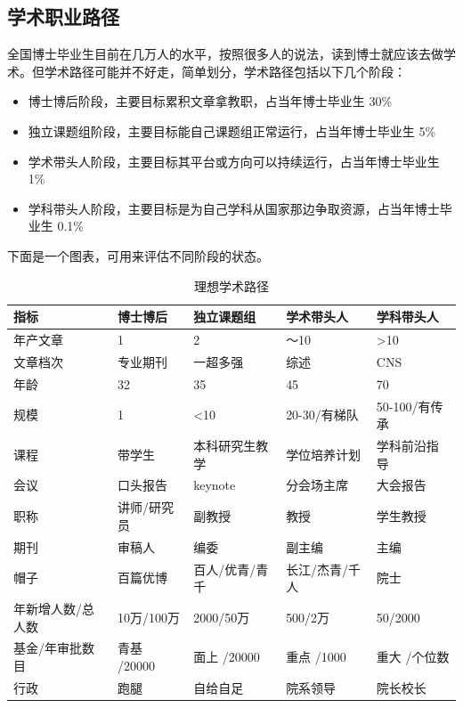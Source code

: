 \documentclass[]{tufte-book}
\begin{document}
\hypertarget{ux5b66ux672fux804cux4e1aux8defux5f84}{%
\subsection{学术职业路径}\label{ux5b66ux672fux804cux4e1aux8defux5f84}}

全国博士毕业生目前在几万人的水平，按照很多人的说法，读到博士就应该去做学术。但学术路径可能并不好走，简单划分，学术路径包括以下几个阶段：

\begin{itemize}
\item
  博士博后阶段，主要目标累积文章拿教职，占当年博士毕业生 30\%
\item
  独立课题组阶段，主要目标能自己课题组正常运行，占当年博士毕业生 5\%
\item
  学术带头人阶段，主要目标其平台或方向可以持续运行，占当年博士毕业生 1\%
\item
  学科带头人阶段，主要目标是为自己学科从国家那边争取资源，占当年博士毕业生 0.1\%
\end{itemize}

下面是一个图表，可用来评估不同阶段的状态。

\begin{longtable}[t]{lllll}
\caption{\label{tab:unnamed-chunk-9}理想学术路径}\\
\toprule
指标 & 博士博后 & 独立课题组 & 学术带头人 & 学科带头人\\
\midrule
年产文章 & 1 & 2 & ～10 & >10\\
文章档次 & 专业期刊 & 一超多强 & 综述 & CNS\\
年龄 & 32 & 35 & 45 & 70\\
规模 & 1 & <10 & 20-30/有梯队 & 50-100/有传承\\
课程 & 带学生 & 本科研究生教学 & 学位培养计划 & 学科前沿指导\\
\addlinespace
会议 & 口头报告 & keynote & 分会场主席 & 大会报告\\
职称 & 讲师/研究员 & 副教授 & 教授 & 学生教授\\
期刊 & 审稿人 & 编委 & 副主编 & 主编\\
帽子 & 百篇优博 & 百人/优青/青千 & 长江/杰青/千人 & 院士\\
年新增人数/总人数 & 10万/100万 & 2000/50万 & 500/2万 & 50/2000\\
\addlinespace
基金/年审批数目 & 青基 /20000 & 面上 /20000 & 重点 /1000 & 重大 /个位数\\
行政 & 跑腿 & 自给自足 & 院系领导 & 院长校长\\
\bottomrule
\end{longtable}
\end{document}
